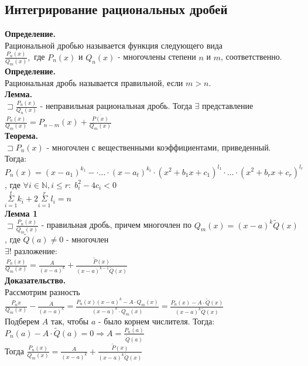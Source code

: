 \documentclass[14pt]{article}
\begin{document}
	\subsection{Интегрирование рациональных дробей} 
	\textbf{Определение.} \\
	Рациональной дробью называется функция следующего вида \\
	$\frac{P_n(x)}{Q_m(x)},$ где $P_n(x)$ и $Q_n(x)$ - многочлены степени $n$ и $m$, соответственно. \\
	\textbf{Определение.} \\
	Рациональная дробь называется правильной, если $m>n$. \\
	\textbf{Лемма.} \\
	$\sqsupset \frac{P_n(x)}{Q_n(x)}$ - неправильная рациональная дробь. Тогда $\exists$ представление $\frac{P_n(x)}{Q_m(x)} = P_{n-m}(x)+\frac{\overline{P(x)}}{Q_m(x)}$ \\
	\textbf{Теорема.} \\
	$\sqsupset P_n(x)$ - многочлен с вещественными коэффициентами, приведенный. \\
	Тогда: \\
	$P_n(x) = (x-a_1)^{k_1} -\cdot \dots \cdot (x-a_t)^{k_t} \cdot (x^2 + b_1x + c_1)^{{l_1}} \cdot \dots \cdot (x^2 + b_rx + c_r )^{l_r}$, где $\forall i \in \mathbb{N}, i\leqslant r: \; b^2_i - 4c_i < 0$ \\
	$\underset{i=1}{\overset{t}{\Sigma}}k_i + 2\underset{i=1}{\overset{r}{\Sigma}}l_i = n$ \\
	\textbf{Лемма 1} \\
	$\sqsupset \frac{P_n(x)}{Q_m(x)}$ - правильная дробь, причем многочлен по $Q_m(x) = (x-a)^k \widetilde{Q}(x)$, где $\widetilde{Q}(a) \neq 0$ - многочлен\\
	$\exists!$ разложение: \\
	$\frac{P_n(x)}{Q_m(x)} = \frac{A}{(x-a)^k} + \frac{\widetilde{P}(x)}{(x-a)^{k-1}\widetilde{Q}(x)}$ \\
	\textbf{Доказательство.} \\
	Рассмотрим разность $\frac{P_n{x}}{Q_m(x)} - \frac{A}{(x-a)^k} = \frac{P_n(x)(x-a)^k - A\cdot Q_m(x)}{(x-a)^k \cdot Q_m(x)} = \frac{P_n(x) - A \cdot \widetilde{Q}(x)}{(x-a)^k\widetilde{Q}(x)}$ \\
	Подберем $A$ так, чтобы $a$ - было корнем числителя. Тогда: \\
	 $P_n(a) - A\cdot \widetilde{Q}(a) = 0 \Rightarrow A = \frac{P_n(a)}{\widetilde{Q}(a)}$  \\
	 Тогда $\frac{P_n(x)}{Q_m(x)}=\frac{A}{(x-a)^k} + \frac{\widetilde{P}(x)}{(x-a)^k\widetilde{Q}(x)}$ \\
\end{document}
